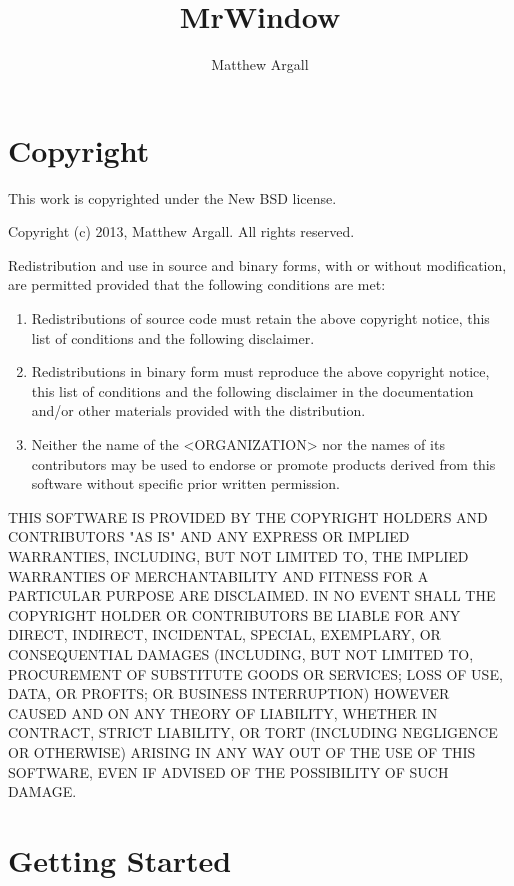 \documentclass[12pt, letterpaper, oneside]{article}		%
\title{MrWindow}
\author{Matthew Argall}
\begin{document}
\maketitle
\tableofcontents

\section{Copyright}
\label{sec: copyright}

This work is copyrighted under the New BSD license.

Copyright (c) 2013, Matthew Argall. All rights reserved.

Redistribution and use in source and binary forms, with or without modification, are permitted provided that the following conditions are met:

\begin{enumerate}
	\item Redistributions of source code must retain the above copyright notice, this list of conditions and the following disclaimer.
	\item Redistributions in binary form must reproduce the above copyright notice, this list of conditions and the following disclaimer in the documentation and/or other materials provided with the distribution.
	\item Neither the name of the <ORGANIZATION> nor the names of its contributors may be used to endorse or promote products derived from this software without specific prior written permission.
\end{enumerate}

THIS SOFTWARE IS PROVIDED BY THE COPYRIGHT HOLDERS AND CONTRIBUTORS "AS IS" AND ANY EXPRESS OR IMPLIED WARRANTIES, INCLUDING, BUT NOT LIMITED TO, THE IMPLIED WARRANTIES OF MERCHANTABILITY AND FITNESS FOR A PARTICULAR PURPOSE ARE DISCLAIMED. IN NO EVENT SHALL THE COPYRIGHT HOLDER OR CONTRIBUTORS BE LIABLE FOR ANY DIRECT, INDIRECT, INCIDENTAL, SPECIAL, EXEMPLARY, OR CONSEQUENTIAL DAMAGES (INCLUDING, BUT NOT LIMITED TO, PROCUREMENT OF SUBSTITUTE GOODS OR SERVICES; LOSS OF USE, DATA, OR PROFITS; OR BUSINESS INTERRUPTION) HOWEVER CAUSED AND ON ANY THEORY OF LIABILITY, WHETHER IN CONTRACT, STRICT LIABILITY, OR TORT (INCLUDING NEGLIGENCE OR OTHERWISE) ARISING IN ANY WAY OUT OF THE USE OF THIS SOFTWARE, EVEN IF ADVISED OF THE POSSIBILITY OF SUCH DAMAGE.

\section{Getting Started}
\label{sec: getting started}
\end{document}
